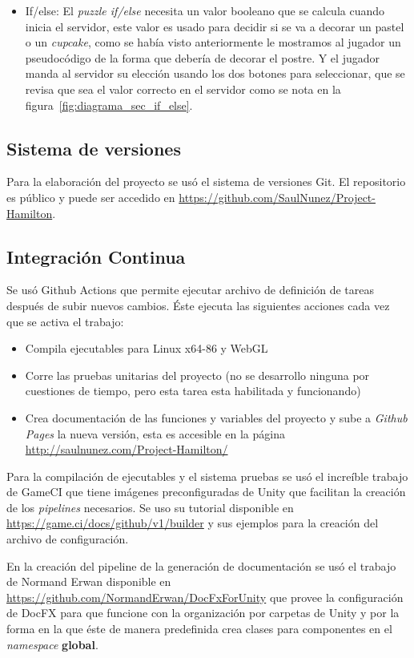 \begin{itemize}
    \item If/else: El \textit{puzzle if/else} necesita un valor booleano que se calcula cuando inicia el servidor, este valor es usado para decidir si se va a decorar un pastel o un \textit{cupcake}, como se había visto anteriormente le mostramos al jugador un pseudocódigo de la forma que debería de decorar el postre. Y el jugador manda al servidor su elección usando los dos botones para seleccionar, que se revisa que sea el valor correcto en el servidor como se nota en la figura~\ref{fig:diagrama_sec_if_else}.
\end{itemize}


\subsection{Sistema de versiones}
Para la elaboración del proyecto se usó el sistema de versiones Git. El repositorio es público y puede ser accedido en \url{https://github.com/SaulNunez/Project-Hamilton}.

\subsection{Integración Continua}
Se usó Github Actions que permite ejecutar archivo de definición de tareas después de subir nuevos cambios.
Éste ejecuta las siguientes acciones cada vez que se activa el trabajo:
\begin{itemize}
    \item Compila ejecutables para Linux x64-86 y WebGL
    \item Corre las pruebas unitarias del proyecto (no se desarrollo ninguna por cuestiones de tiempo, pero esta tarea esta habilitada y funcionando) 
    \item Crea documentación de las funciones y variables del proyecto y sube a \textit{Github Pages} la nueva versión, esta es accesible en la página  \url{http://saulnunez.com/Project-Hamilton/}
\end{itemize}

Para la compilación de ejecutables y el sistema pruebas se usó el increíble trabajo de GameCI que tiene imágenes preconfiguradas de Unity que facilitan la creación de los \textit{pipelines} necesarios. Se uso su tutorial disponible en \url{https://game.ci/docs/github/v1/builder} y sus ejemplos para la creación del archivo de configuración.

En la creación del pipeline de la generación de documentación se usó el trabajo de Normand Erwan disponible en \url{https://github.com/NormandErwan/DocFxForUnity} que provee la configuración de DocFX para que funcione con la organización por carpetas de Unity y por la forma en la que éste de manera predefinida crea clases para componentes en el \textit{namespace} \textbf{global}.

